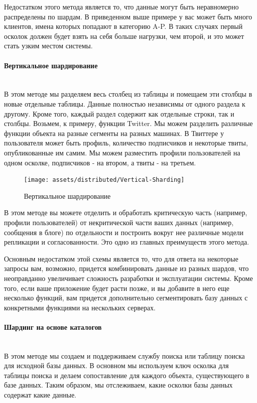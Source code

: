 Недостатком этого метода является то, что данные могут быть неравномерно распределены по шардам. В приведенном выше
примере у вас может быть много клиентов, имена которых попадают в категорию A-P. В таких случаях первый осколок должен
будет взять на себя больше нагрузки, чем второй, и это может стать узким местом системы. \autocite{DatabaseSharding}

\paragraph{Вертикальное шардирование} ~\\
В этом методе мы разделяем весь столбец из таблицы и помещаем эти столбцы в новые отдельные таблицы. Данные полностью
независимы от одного раздела к другому. Кроме того, каждый раздел содержит как отдельные строки, так и столбцы. Возьмем,
к примеру, функции Twitter. Мы можем разделить различные функции объекта на разные сегменты на разных машинах. В
Твиттере у пользователя может быть профиль, количество подписчиков и некоторые твиты, опубликованные им самим. Мы можем
разместить профили пользователей на одном осколке, подписчиков - на втором, а твиты - на третьем.

\begin{figure}[H]
    \centering
    \texttt{[image: assets/distributed/Vertical-Sharding]}
    \caption{Вертикальное шардирование}
    \label{fig:Vertical-Sharding}
\end{figure}

В этом методе вы можете отделить и обработать критическую часть (например, профили пользователей) от некритической части
ваших данных (например, сообщения в блоге) по отдельности и построить вокруг нее различные модели репликации и
согласованности. Это одно из главных преимуществ этого метода.

Основным недостатком этой схемы является то, что для ответа на некоторые запросы вам, возможно, придется комбинировать
данные из разных шардов, что неоправданно увеличивает сложность разработки и эксплуатации системы. Кроме того, если
ваше приложение будет расти позже, и вы добавите в него еще несколько функций, вам придется дополнительно сегментировать
базу данных с конкретными функциями на нескольких серверах. \autocite{DatabaseSharding}

\paragraph{Шардинг на основе каталогов} ~\\
В этом методе мы создаем и поддерживаем службу поиска или таблицу поиска для исходной базы данных. В основном мы
используем ключ осколка для таблицы поиска и делаем сопоставление для каждого объекта, существующего в базе данных.
Таким образом, мы отслеживаем, какие осколки базы данных содержат какие данные.


